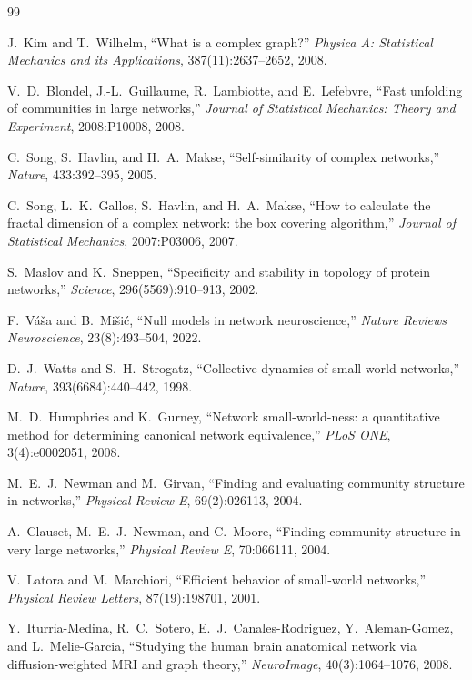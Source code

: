 \documentclass[12pt]{article}
\begin{document}
\begin{thebibliography}{99}

J.~Kim and T.~Wilhelm,
``What is a complex graph?''
\emph{Physica A: Statistical Mechanics and its Applications},
387(11):2637--2652, 2008.

V.~D.~Blondel, J.-L.~Guillaume, R.~Lambiotte, and E.~Lefebvre,
``Fast unfolding of communities in large networks,''
\emph{Journal of Statistical Mechanics: Theory and Experiment},
2008:P10008, 2008.

C.~Song, S.~Havlin, and H.~A.~Makse,
``Self-similarity of complex networks,''
\emph{Nature}, 433:392--395, 2005.

C.~Song, L.~K.~Gallos, S.~Havlin, and H.~A.~Makse,
``How to calculate the fractal dimension of a complex network: the box covering algorithm,''
\emph{Journal of Statistical Mechanics}, 2007:P03006, 2007.

S.~Maslov and K.~Sneppen,
``Specificity and stability in topology of protein networks,''
\emph{Science}, 296(5569):910--913, 2002.

F.~V\'a\v{s}a and B.~Mi\v{s}i\'c,
``Null models in network neuroscience,''
\emph{Nature Reviews Neuroscience}, 23(8):493--504, 2022.

D.~J.~Watts and S.~H.~Strogatz,
``Collective dynamics of small-world networks,''
\emph{Nature}, 393(6684):440--442, 1998.

M.~D.~Humphries and K.~Gurney,
``Network small-world-ness: a quantitative method for determining canonical network equivalence,''
\emph{PLoS ONE}, 3(4):e0002051, 2008.

M.~E.~J.~Newman and M.~Girvan,
``Finding and evaluating community structure in networks,''
\emph{Physical Review E}, 69(2):026113, 2004.

A.~Clauset, M.~E.~J.~Newman, and C.~Moore,
``Finding community structure in very large networks,''
\emph{Physical Review E}, 70:066111, 2004.

V.~Latora and M.~Marchiori,
``Efficient behavior of small-world networks,''
\emph{Physical Review Letters}, 87(19):198701, 2001.

Y.~Iturria-Medina, R.~C.~Sotero, E.~J.~Canales-Rodriguez,
Y.~Aleman-Gomez, and L.~Melie-Garcia,
``Studying the human brain anatomical network via diffusion-weighted MRI and graph theory,''
\emph{NeuroImage}, 40(3):1064--1076, 2008.


\end{thebibliography}
\end{document}

